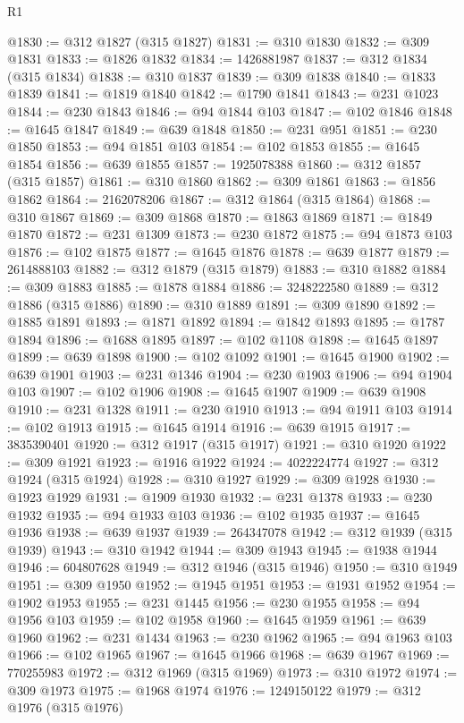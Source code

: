 \begin{lexlean}{R1}
\begin{coremodule}
@1830 := @312 @1827 (@315 @1827)
@1831 := @310 @1830
@1832 := @309 @1831
@1833 := @1826 @1832
@1834 := 1426881987
@1837 := @312 @1834 (@315 @1834)
@1838 := @310 @1837
@1839 := @309 @1838
@1840 := @1833 @1839
@1841 := @1819 @1840
@1842 := @1790 @1841
@1843 := @231 @1023
@1844 := @230 @1843
@1846 := @94 @1844 @103
@1847 := @102 @1846
@1848 := @1645 @1847
@1849 := @639 @1848
@1850 := @231 @951
@1851 := @230 @1850
@1853 := @94 @1851 @103
@1854 := @102 @1853
@1855 := @1645 @1854
@1856 := @639 @1855
@1857 := 1925078388
@1860 := @312 @1857 (@315 @1857)
@1861 := @310 @1860
@1862 := @309 @1861
@1863 := @1856 @1862
@1864 := 2162078206
@1867 := @312 @1864 (@315 @1864)
@1868 := @310 @1867
@1869 := @309 @1868
@1870 := @1863 @1869
@1871 := @1849 @1870
@1872 := @231 @1309
@1873 := @230 @1872
@1875 := @94 @1873 @103
@1876 := @102 @1875
@1877 := @1645 @1876
@1878 := @639 @1877
@1879 := 2614888103
@1882 := @312 @1879 (@315 @1879)
@1883 := @310 @1882
@1884 := @309 @1883
@1885 := @1878 @1884
@1886 := 3248222580
@1889 := @312 @1886 (@315 @1886)
@1890 := @310 @1889
@1891 := @309 @1890
@1892 := @1885 @1891
@1893 := @1871 @1892
@1894 := @1842 @1893
@1895 := @1787 @1894
@1896 := @1688 @1895
@1897 := @102 @1108
@1898 := @1645 @1897
@1899 := @639 @1898
@1900 := @102 @1092
@1901 := @1645 @1900
@1902 := @639 @1901
@1903 := @231 @1346
@1904 := @230 @1903
@1906 := @94 @1904 @103
@1907 := @102 @1906
@1908 := @1645 @1907
@1909 := @639 @1908
@1910 := @231 @1328
@1911 := @230 @1910
@1913 := @94 @1911 @103
@1914 := @102 @1913
@1915 := @1645 @1914
@1916 := @639 @1915
@1917 := 3835390401
@1920 := @312 @1917 (@315 @1917)
@1921 := @310 @1920
@1922 := @309 @1921
@1923 := @1916 @1922
@1924 := 4022224774
@1927 := @312 @1924 (@315 @1924)
@1928 := @310 @1927
@1929 := @309 @1928
@1930 := @1923 @1929
@1931 := @1909 @1930
@1932 := @231 @1378
@1933 := @230 @1932
@1935 := @94 @1933 @103
@1936 := @102 @1935
@1937 := @1645 @1936
@1938 := @639 @1937
@1939 := 264347078
@1942 := @312 @1939 (@315 @1939)
@1943 := @310 @1942
@1944 := @309 @1943
@1945 := @1938 @1944
@1946 := 604807628
@1949 := @312 @1946 (@315 @1946)
@1950 := @310 @1949
@1951 := @309 @1950
@1952 := @1945 @1951
@1953 := @1931 @1952
@1954 := @1902 @1953
@1955 := @231 @1445
@1956 := @230 @1955
@1958 := @94 @1956 @103
@1959 := @102 @1958
@1960 := @1645 @1959
@1961 := @639 @1960
@1962 := @231 @1434
@1963 := @230 @1962
@1965 := @94 @1963 @103
@1966 := @102 @1965
@1967 := @1645 @1966
@1968 := @639 @1967
@1969 := 770255983
@1972 := @312 @1969 (@315 @1969)
@1973 := @310 @1972
@1974 := @309 @1973
@1975 := @1968 @1974
@1976 := 1249150122
@1979 := @312 @1976 (@315 @1976)

\end{coremodule}
\end{lexlean}
